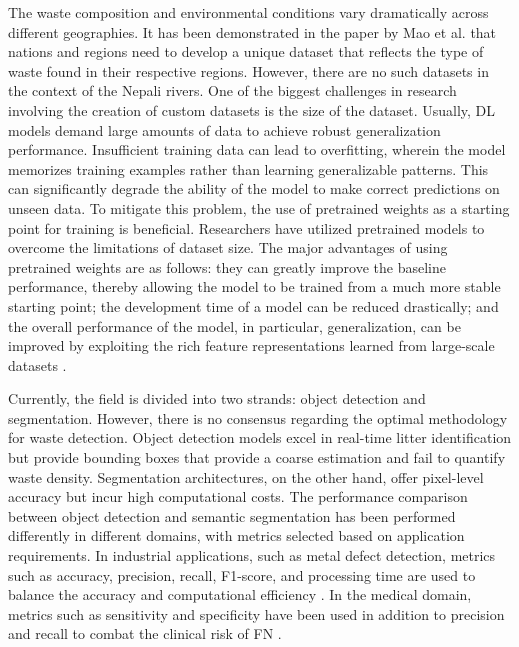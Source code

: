 \documentclass{ieeeaccess}
\begin{document}
The waste composition and environmental conditions vary dramatically across different geographies. It has been demonstrated in the paper by Mao et al. \cite{Mao2022DeepLN} that nations and regions need to develop a unique dataset that reflects the type of waste found in their respective regions. However, there are no such datasets in the context of the Nepali rivers. One of the biggest challenges in research involving the creation of custom datasets is the size of the dataset. Usually, DL models demand large amounts of data to achieve robust generalization performance. Insufficient training data can lead to overfitting, wherein the model memorizes training examples rather than learning generalizable patterns. This can significantly degrade the ability of the model to make correct predictions on unseen data. To mitigate this problem, the use of pretrained weights as a starting point for training is beneficial. Researchers have utilized pretrained models to overcome the limitations of dataset size. The major advantages of using pretrained weights are as follows: they can greatly improve the baseline performance, thereby allowing the model to be trained from a much more stable starting point; the development time of a model can be reduced drastically; and the overall performance of the model, in particular, generalization, can be improved by exploiting the rich feature representations learned from large-scale datasets \cite{maitra2015cnn}.
 
Currently, the field is divided into two strands: object detection and segmentation. However, there is no consensus regarding the optimal methodology for waste detection. Object detection models excel in real-time litter identification but provide bounding boxes that provide a coarse estimation and fail to quantify waste density. Segmentation architectures, on the other hand, offer pixel-level accuracy but incur high computational costs. The performance comparison between object detection and semantic segmentation has been performed differently in different domains, with metrics selected based on application requirements. In industrial applications, such as metal defect detection, metrics such as accuracy, precision, recall, F1-score, and processing time are used to balance the accuracy and computational efficiency \cite{Usamentiaga2022AutomatedSD}. In the medical domain, metrics such as sensitivity and specificity have been used in addition to precision and recall to combat the clinical risk of FN \cite{Shan2021AutomatedIO}.
\end{document}
